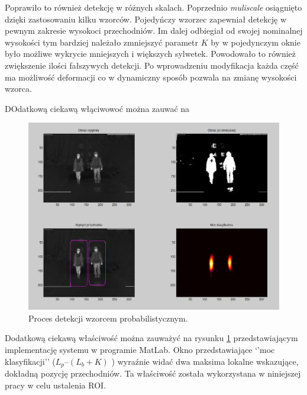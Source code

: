Poprawiło to również detekcję w różnych skalach. Poprzednio \textit{muliscale} osiągnięto dzięki zastosowaniu kilku wzorców. Pojedyńczy wzorzec zapewniał detekcję w pewnym zakresie wysokoci przechodniów. Im dalej odbiegiał od swojej nominalnej wysokości tym bardziej należało zmniejszyć parametr $K$ by w pojedynczym oknie było możliwe wykrycie mniejszych i większych sylwetek. Powodowało to również zwiększenie ilości fałszywych detekcji. Po wprowadzeniu modyfikacja każda część ma możliwość deformacji co w dynamiczny sposób pozwala na zmianę wysokości wzorca.

DOdatkową ciekawą włąciwowoć można zauwać na 

\begin{figure}
\centering
\includegraphics[width=0.8\linewidth]{images/sim_window.png}
\caption[Proces detekcji wzorcem probabilistycznym.]{Proces detekcji wzorcem probabilistycznym. \cite{kankaing}}
\label{fig:sim_window}
\end{figure}

Dodatkową ciekawą właściwość można zauważyć na rysunku \ref{fig:sim_window} przedstawiającym implementację systemu w programie MatLab. Okno przedstawiające ‘’moc klasyfikacji’’ ($L_p – (L_b + K)$ ) wyraźnie widać dwa maksima lokalne wskazujące, dokładną pozycję przechodniów. Ta właściwość została wykorzystana w niniejszej pracy w celu ustalenia ROI.




